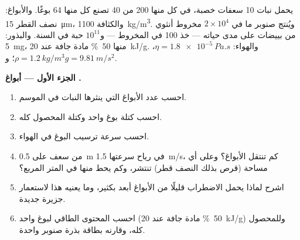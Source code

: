 \begin{problem}
\label{pb:b2:plant-life-cycles:1}
يحمل نبات  \num{10} سعفات خصبة، في كل منها \num{200}
 من \num{40}  تصنع كل منها \num{64} بوغًا. والأبواغ:
نصف القطر \qty{15}{\micro m}، والكثافة \qty{1100}{kg/m^3}. ويُنتج
صنوبر ما في $2\times 10^{4}$ مخروط أنثوي من بييضات على مدى
حياته --- خذ \num{100}  في المخروط --- و$10^{11}$ حبة 
في السنة. والبذور: \qty{5}{mg}، منها \qty{50}{\%} مادة جافة عند
\qty{20}{kJ/g}. والهواء: $\eta = \qty{1.8e-5}{Pa.s}$، $\rho =
\qty{1.2}{kg/m^3}$؛ و$g = \qty{9.81}{m/s^2}$.

\medskip
\noindent\textbf{الجزء الأول --- أبواغ .}
\begin{enumerate}
  \item احسب عدد الأبواغ التي ينثرها النبات في الموسم.
  \item احسب كتلة بوغ واحد وكتلة المحصول كله.
  \item احسب سرعة ترسيب البوغ في الهواء.
  \item من سعف على \qty{0.5}{m} في رياح سرعتها \qty{1.5}{m/s}، كم
        تنتقل الأبواغ؟ وعلى أي مساحة (قرص بذلك النصف قطر) تنتشر،
        وكم يحط منها في المتر المربع؟
  \item اشرح لماذا يحمل الاضطراب قليلًا من الأبواغ أبعد بكثير، وما
        يعنيه هذا لاستعمار جزيرة جديدة.
  \item احسب المحتوى الطاقي لبوغ واحد (\qty{50}{\%} مادة جافة عند
        \qty{20}{kJ/g}) وللمحصول كله، وقارنه بطاقة بذرة صنوبر واحدة.
\end{enumerate}


\end{problem}
